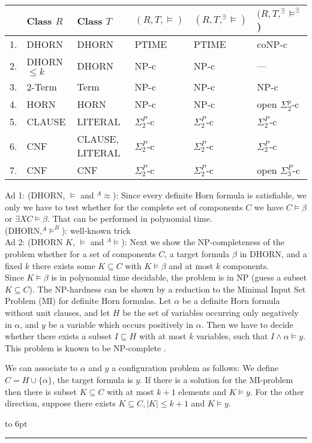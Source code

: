 \documentclass[12pt]{article}
\newcommand{\AMB}{\mbox{$^A$\hspace{-0.5mm}$\models^B$}}
\newcommand{\AM}{\mbox{$^A$\hspace{-0.5mm}$\models$}}
\newcommand{\AEQ}{\mbox{$^A$\hspace{-0.5mm}$\approx$}}
\newenvironment{proof}{\parindent=0pt{\bf Proof: }}{
   \hspace*{\fill}\hbox to 6pt{\leaders\hrule width 6pt height 6pt\hfill}\par}
\begin{document}
\noindent\begin{tabular}{|l|l|l|l|l|l|}
\hline
 & {Class $R$ } & Class $T$ &  $(R,T,\models)$ & $(R, T, ^\exists\!\models)$ & $(R, T,^\exists\!\models^\exists$) \\ \hline
1. & DHORN & DHORN          & PTIME & PTIME  & coNP-c         \\ \hline
2. & DHORN $\leq k$ & DHORN & NP-c  & NP-c   & ---         \\ \hline
3. & 2-Term & Term          & NP-c  & NP-c   & NP-c           \\ \hline
4. & HORN & HORN                       & NP-c  & NP-c   & open $\Sigma^p_2$-c \\ \hline
5. & CLAUSE & LITERAL       & $\Sigma_2^P$-c & $\Sigma_2^P$-c & $\Sigma_2^P$-c \\ \hline
6. & CNF & CLAUSE, LITERAL  & $\Sigma_2^P$-c & $\Sigma_2^P$-c & $\Sigma_2^P$-c \\ \hline
7. & CNF & CNF              & $\Sigma_2^P$-c & $\Sigma_2^P$-c & open $\Sigma_3^P$-c \\ \hline
\end{tabular}

\color{black}




\vspace*{5mm}

\begin{proof}
Ad 1: (DHORN, $\models$ and \AEQ): Since every definite Horn formula is satisfiable, we only we have to test whether for the complete set of components $C$ we have $C \models \beta$ or $\exists X C \models \beta$. That can be performed in polynomial time.\\

(DHORN,\AMB): well-known trick\\

Ad 2: (DHORN $K$, $\models$ and \AM): Next we show the NP-completeness of the problem whether for a set of components $C$, a target formula $\beta$ in DHORN, and a fixed $k$ there exists some $K \subseteq C$ with $K \models \beta$ and at most $k$ components.\\
Since $K \models \beta$ is in polynomial time decidable, the problem is in NP (guess a subset $K \subseteq C$).
The NP-hardness can be shown by a reduction to the Minimal Input Set Problem (MI) for definite Horn formulas.
Let $\alpha$ be a definite Horn formula without unit clauses, and let $H$ be the set of variables occurring only
negatively in $\alpha$, and $y$ be a variable which occurs positively in $\alpha$. Then we have to decide whether
there exists a subset $I \subseteq H$ with at most $k$ variables, such that $I \wedge \alpha \models y$. This problem is known to be NP-complete \cite{mi}.

We can associate to $\alpha$ and $y$ a configuration problem as follows: We define $C = H \cup \{\alpha\}$, the target
formula is $y$. If there is a solution for the MI-problem then there is subset $K \subseteq C$ with at most $k+1$ elements
and $K \models y$. For the other direction, suppose there exists $K \subseteq C, |K | \leq k+1$ and $K \models y$.
\end{proof}
\end{document}
